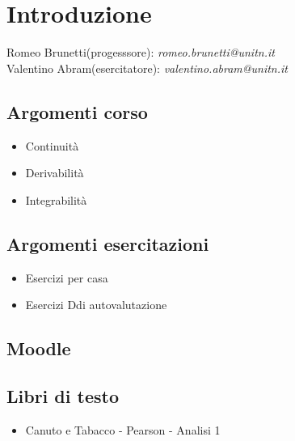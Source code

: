 \section{Introduzione}

\label{sec:lezione1}
Romeo Brunetti(progesssore): \textit{romeo.brunetti@unitn.it}\\
Valentino Abram(esercitatore): \textit{valentino.abram@unitn.it}

\begin{minipage}[t]{0.48\textwidth}

	\subsection{Argomenti corso}
	\label{sub:argomentilezioni}
	\begin{itemize}
		\item Continuità
		\item Derivabilità
		\item Integrabilità
	\end{itemize}
\end{minipage}
%
\begin{minipage}[t]{0.48\textwidth}
	\subsection{Argomenti esercitazioni}
	\label{sub:argomentiesercitazioni}
	\begin{itemize}
		\item Esercizi per casa
		\item Esercizi Ddi autovalutazione
	\end{itemize}

\end{minipage}

\subsection{Moodle}
\label{sub:moodle}

\subsection{Libri di testo}
\label{sub:libriditesto}
\begin{itemize}
	\item Canuto e Tabacco - Pearson - Analisi 1
\end{itemize}

